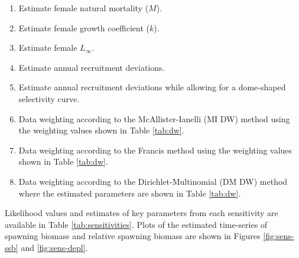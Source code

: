 \documentclass[11pt,
  english,
  a4paper,
]{article}
\begin{document}
\begin{enumerate}

  \item Estimate female natural mortality ($M$).
  
  \item Estimate female growth coefficient ($k$).

  \item Estimate female $L_{\infty}$. 
    
  \item Estimate annual recruitment deviations. 

  \item Estimate annual recruitment deviations while allowing for a dome-shaped selectivity curve. 
  
  \item Data weighting according to the McAllister-Ianelli (MI DW) method using the weighting values shown in Table \ref{tab:dw}. 

  \item Data weighting according to the Francis method using the weighting values shown in Table \ref{tab:dw}. 
  
  \item Data weighting according to the Dirichlet-Multinomial (DM DW) method where the estimated parameters are shown in Table \ref{tab:dw}. 
  
\end{enumerate}


Likelihood values and estimates of key parameters from each sensitivity are available in Table \ref{tab:sensitivities}. Plots of the estimated time-series of spawning biomass and relative spawning biomass are shown in Figures \ref{fig:sens-ssb} and \ref{fig:sens-depl}.

\leavevmode\tagmcend\tagstructend\par

\end{document}
